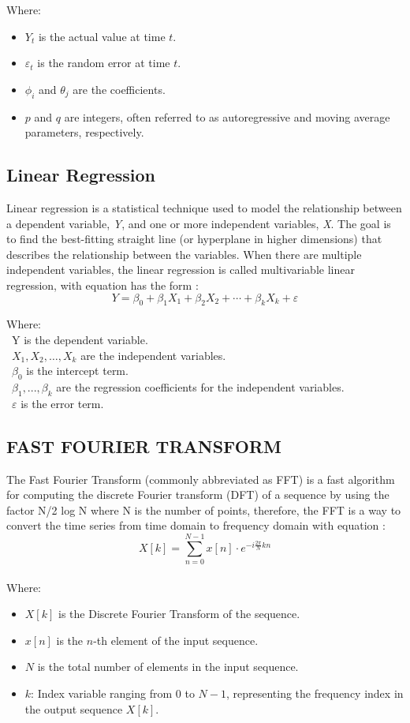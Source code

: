 \documentclass{ieeeojies}
\begin{document}
Where:
\begin{itemize}
    \item $Y_t$ is the actual value at time $t$.
    \item $\varepsilon_t$ is the random error at time $t$.
    \item $\phi_i$ and $\theta_j$ are the coefficients.
    \item $p$ and $q$ are integers, often referred to as autoregressive and moving average parameters, respectively.
\end{itemize}

\subsection{Linear Regression}
Linear regression is a statistical technique used to model the relationship between a dependent variable, \textit{Y}, and one or more independent variables, \textit{X}. The goal is to find the best-fitting straight line (or hyperplane in higher dimensions) that describes the relationship between the variables. 
When there are multiple independent variables, the linear regression is called multivariable linear regression, with equation has the form \cite{busin}:
 \[Y=\beta_0+\beta_1X_1+\beta_2X_2+\cdots+\beta_kX_k+\varepsilon\]
 
Where:\\
	\indent\textbullet\ Y is the dependent variable.\\
	\indent\textbullet\ \(X_1, X_2, \ldots, X_k\) are the independent variables.\\
	\indent\textbullet\ \(\beta_0\) is the intercept term.\\
	\indent\textbullet\ \(\beta_1,..., \beta_k\) are the regression coefficients for the independent variables.\\
	\indent\textbullet\ \(\varepsilon\) is the error term.

\subsection{FAST FOURIER TRANSFORM}
The Fast Fourier Transform (commonly abbreviated as
FFT) is a fast algorithm for computing the discrete Fourier
transform (DFT) of a sequence \cite{Gillian} by using the factor N/2
log N where N is the number of points, therefore, the FFT is a
way to convert the time series from time domain to frequency
domain \cite{Musbah} with equation \cite{Roberts}: 
\[
X[k] = \sum_{n=0}^{N-1} x[n] \cdot e^{-i \frac{2\pi}{N} kn}
\]
\\
Where:
\begin{itemize}
    \item $X[k]$ is the Discrete Fourier Transform of the sequence.
    \item $ x[n]$ is the $n$-th element of the input sequence.
    \item $N$ is the total number of elements in the input sequence.
    \item \( k \): Index variable ranging from \( 0 \) to \( N-1 \), representing the frequency index in the output sequence \( X[k] \).
\end{itemize}
\end{document}

